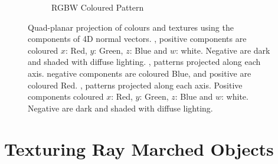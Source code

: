 \documentclass{l4proj}
\begin{document}
\begin{figure}[H]
\begin{subfigure}[b]{0.25\textwidth}
    \caption{
      RGBW Coloured Pattern
    }
    \label{fig:tex3}
  \end{subfigure}
  \caption{
    Quad-planar projection of colours and textures using the components of 4D normal vectors.
    , positive components are coloured $x$: Red, $y$: Green, $z$: Blue and $w$: white. Negative are dark and shaded with diffuse lighting.
    , patterns projected along each axis. negative components are coloured Blue, and positive are coloured Red.
    , patterns projected along each axis. Positive components coloured $x$: Red, $y$: Green, $z$: Blue and $w$: white. Negative are dark and shaded with diffuse lighting.
  }
  \label{fig:textures}
\end{figure}

\section{Texturing Ray Marched Objects}
\end{document}
